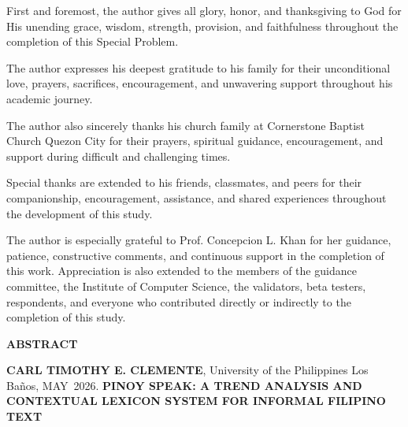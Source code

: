 \documentclass{icsthesis}
\renewcommand{\TITLE}{PINOY SPEAK: A TREND ANALYSIS AND CONTEXTUAL LEXICON SYSTEM FOR INFORMAL FILIPINO TEXT}
\renewcommand{\AUTHOR}{CARL TIMOTHY E. CLEMENTE}
\renewcommand{\MONTH}{MAY}
\renewcommand{\YEAR}{2026}
\begin{document}
\begin{frontmatter}
\begin{biosketch}
\end{biosketch}


\begin{acknowledgement}

First and foremost, the author gives all glory, honor, and thanksgiving to God for His unending grace, wisdom, strength, provision, and faithfulness throughout the completion of this Special Problem.

The author expresses his deepest gratitude to his family for their unconditional love, prayers, sacrifices, encouragement, and unwavering support throughout his academic journey.

The author also sincerely thanks his church family at Cornerstone Baptist Church Quezon City for their prayers, spiritual guidance, encouragement, and support during difficult and challenging times.

Special thanks are extended to his friends, classmates, and peers for their companionship, encouragement, assistance, and shared experiences throughout the development of this study.

The author is especially grateful to Prof. Concepcion L. Khan for her guidance, patience, constructive comments, and continuous support in the completion of this work. Appreciation is also extended to the members of the guidance committee, the Institute of Computer Science, the validators, beta testers, respondents, and everyone who contributed directly or indirectly to the completion of this study.

\end{acknowledgement}


\clearpage
\addtocounter{pagecounter}{1}
\setcounter{page}{\value{pagecounter}}
\thispagestyle{plain}

\begin{center}
    \bfseries ABSTRACT
\end{center}

\vspace{1em}

\noindent
\textbf{\AUTHOR}, University of the Philippines Los Ba{\~n}os, \MONTH\ \YEAR. \textbf{\TITLE}


\end{frontmatter}
\end{document}
